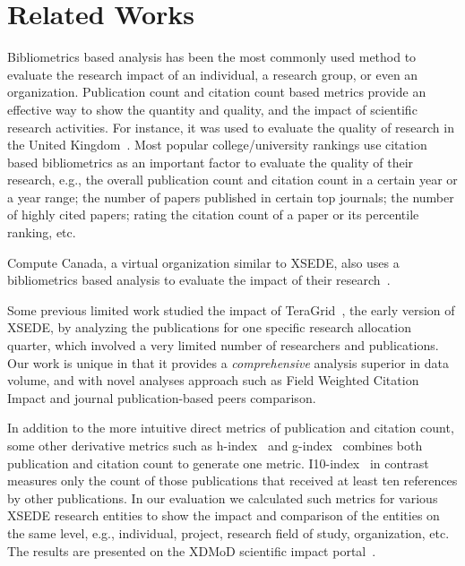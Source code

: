 \documentclass[sigconf]{acmart}
\begin{document}
\section{Related Works} \label{S:related}

Bibliometrics based analysis has been the most commonly used method to
evaluate the research impact of an individual, a research group, or
even an organization. Publication count and citation count based
metrics provide an effective way to show the quantity and quality, and
the impact of scientific research activities. For instance, it was
used to evaluate the quality of research in the United
Kingdom~\cite{thomas1998institutional,penfield2014assessment}. Most
popular college/university rankings use citation based bibliometrics
as an important factor to evaluate the quality of their research,
e.g., the overall publication count and citation count in a certain
year or a year range; the number of papers published in certain top
journals; the number of highly cited papers; rating the citation count
of a paper or its percentile ranking, etc.

Compute Canada, a virtual organization similar to XSEDE, also uses a
bibliometrics based analysis to evaluate the impact of their
research~\cite{www-computecanada}.

Some previous limited work studied the impact of
TeraGrid~\cite{bollen2011and}, the early version of XSEDE, by
analyzing the publications for one specific research allocation
quarter, which involved a very limited number of researchers and
publications. Our work is unique in that it provides a {\em
  comprehensive} analysis superior in data volume, and with novel
analyses approach such as Field Weighted Citation Impact and journal
publication-based peers comparison.

In addition to the more intuitive direct metrics of publication and
citation count, some other derivative metrics such as
h-index~\cite{hirsch2005index} and g-index~\cite{egghe2006theory}
combines both publication and citation count to generate one
metric. I10-index~\cite {www-i10index} in contrast measures only the
count of those publications that received at least ten references by
other publications.  In our evaluation we calculated such metrics for
various XSEDE research entities to show the impact and comparison of
the entities on the same level, e.g., individual, project, research
field of study, organization, etc. The results are presented on the
XDMoD scientific impact portal~\cite{www-xdmod-sciimp}.
\end{document}
